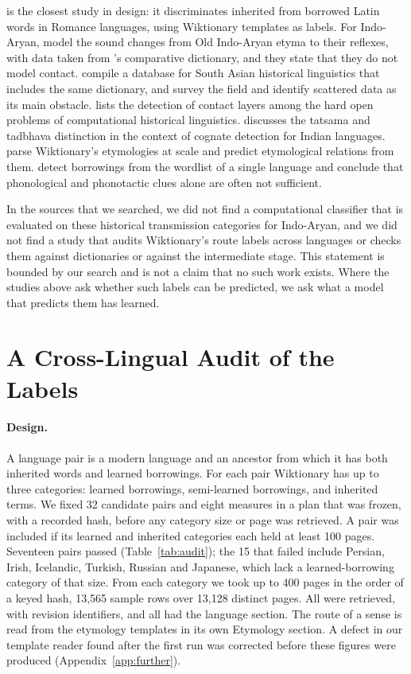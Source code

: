 \documentclass[11pt]{article}
\begin{document}
\citet{cristea2021inherited} is the closest study in design: it discriminates inherited from borrowed Latin words in Romance languages, using Wiktionary templates as labels. For Indo-Aryan, \citet{cathcart2020disentangling} model the sound changes from Old Indo-Aryan etyma to their reflexes, with data taken from \citeauthor{turner1966cdial}'s comparative dictionary, and they state that they do not model contact. \citet{arora2023jambu} compile a database for South Asian historical linguistics that includes the same dictionary, and \citet{arora2022computational} survey the field and identify scattered data as its main obstacle. \citet{list2024openproblems} lists the detection of contact layers among the hard open problems of computational historical linguistics. \citet[\S4.1]{kanojia2021thesis} discusses the tatsama and tadbhava distinction in the context of cognate detection for Indian languages. \citet{wu2020computational} parse Wiktionary's etymologies at scale and predict etymological relations from them. \citet{miller2020lexical} detect borrowings from the wordlist of a single language and conclude that phonological and phonotactic clues alone are often not sufficient.

In the sources that we searched, we did not find a computational classifier that is evaluated on these historical transmission categories for Indo-Aryan, and we did not find a study that audits Wiktionary's route labels across languages or checks them against dictionaries or against the intermediate stage. This statement is bounded by our search and is not a claim that no such work exists. Where the studies above ask whether such labels can be predicted, we ask what a model that predicts them has learned.

\section{A Cross-Lingual Audit of the Labels}
\label{sec:audit}

\paragraph{Design.} A language pair is a modern language and an ancestor from which it has both inherited words and learned borrowings. For each pair Wiktionary has up to three categories: learned borrowings, semi-learned borrowings, and inherited terms. We fixed 32 candidate pairs and eight measures in a plan that was frozen, with a recorded hash, before any category size or page was retrieved. A pair was included if its learned and inherited categories each held at least 100 pages. Seventeen pairs passed (Table~\ref{tab:audit}); the 15 that failed include Persian, Irish, Icelandic, Turkish, Russian and Japanese, which lack a learned-borrowing category of that size. From each category we took up to 400 pages in the order of a keyed hash, 13,565 sample rows over 13,128 distinct pages. All were retrieved, with revision identifiers, and all had the language section. The route of a sense is read from the etymology templates in its own Etymology section. A defect in our template reader found after the first run was corrected before these figures were produced (Appendix~\ref{app:further}).
\end{document}
